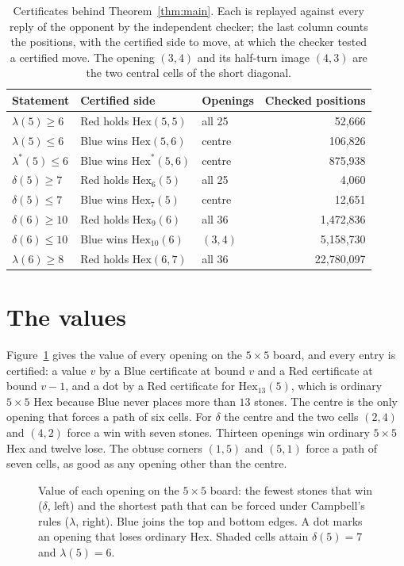\documentclass[11pt]{amsart}
\theoremstyle{definition}
\theoremstyle{remark}
\newcommand{\Hex}{\mathrm{Hex}}
\begin{document}
\begin{table}[ht]
\centering
\begin{tabular}{@{}lllr@{}}
\toprule
Statement & Certified side & Openings & Checked positions\\
\midrule
$\lambda(5)\ge6$ & Red holds $\Hex(5,5)$ & all 25 & 52{,}666\\
$\lambda(5)\le6$ & Blue wins $\Hex(5,6)$ & centre & 106{,}826\\
$\lambda^{*}(5)\le6$ & Blue wins $\Hex^{*}(5,6)$ & centre & 875{,}938\\
$\delta(5)\ge7$ & Red holds $\Hex_6(5)$ & all 25 & 4{,}060\\
$\delta(5)\le7$ & Blue wins $\Hex_7(5)$ & centre & 12{,}651\\
$\delta(6)\ge10$ & Red holds $\Hex_9(6)$ & all 36 & 1{,}472{,}836\\
$\delta(6)\le10$ & Blue wins $\Hex_{10}(6)$ & $(3,4)$ & 5{,}158{,}730\\
$\lambda(6)\ge8$ & Red holds $\Hex(6,7)$ & all 36 & 22{,}780{,}097\\
\bottomrule
\end{tabular}
\caption{Certificates behind Theorem~\ref{thm:main}. Each is replayed against every reply of the opponent by the independent checker; the last column counts the positions, with the certified side to move, at which the checker tested a certified move. The opening $(3,4)$ and its half-turn image $(4,3)$ are the two central cells of the short diagonal.}
\label{tab:cert}
\end{table}

\section{The values}

Figure~\ref{fig:tables} gives the value of every opening on the $5\times5$ board, and every entry is certified: a value $v$ by a Blue certificate at bound $v$ and a Red certificate at bound $v-1$, and a dot by a Red certificate for $\Hex_{13}(5)$, which is ordinary $5\times5$ Hex because Blue never places more than $13$ stones. The centre is the only opening that forces a path of six cells. For $\delta$ the centre and the two cells $(2,4)$ and $(4,2)$ force a win with seven stones. Thirteen openings win ordinary $5\times5$ Hex and twelve lose. The obtuse corners $(1,5)$ and $(5,1)$ force a path of seven cells, as good as any opening other than the centre.

\begin{figure}[ht]
\centering

\caption{Value of each opening on the $5\times5$ board: the fewest stones that win ($\delta$, left) and the shortest path that can be forced under Campbell's rules ($\lambda$, right). Blue joins the top and bottom edges. A dot marks an opening that loses ordinary Hex. Shaded cells attain $\delta(5)=7$ and $\lambda(5)=6$.}
\label{fig:tables}
\end{figure}
\end{document}
